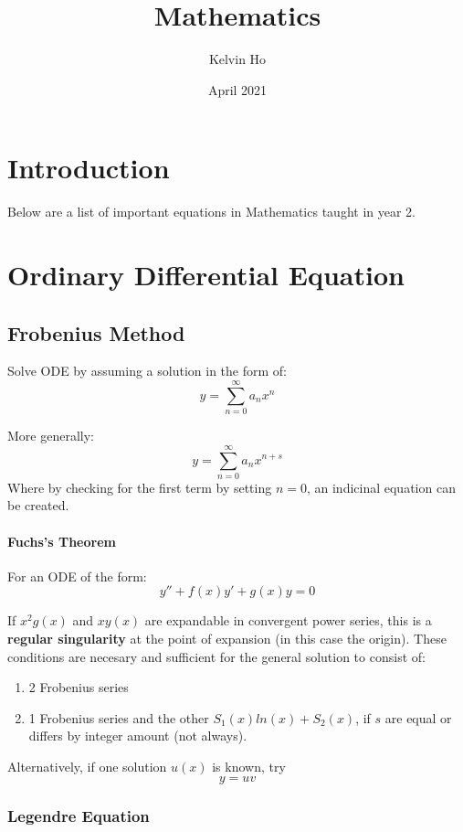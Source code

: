 \documentclass[12pt]{article}
\title{Mathematics}
\author{Kelvin Ho}
\date{April 2021}
\begin{document}
\maketitle

\section{Introduction}
Below are a list of important equations in Mathematics taught in year 2.



\section{Ordinary Differential Equation}

\subsection{Frobenius Method}
Solve ODE by assuming a solution in the form of: \[y = \sum_{n=0}^{\infty} a_n x^n\]

More generally:
\[y = \sum_{n=0}^{\infty} a_n x^{n+s}\]
Where by checking for the first term by setting $n=0$, an indicinal equation can be created. 

\paragraph{Fuchs's Theorem}

For an ODE of the form:
\[ y'' + f(x)y' + g(x) y = 0\]

If $x^2g(x)$ and $xy(x)$ are expandable in convergent power series, this is a \textbf{regular singularity} at the point of expansion (in this case the origin). These conditions are necesary and sufficient for the general solution to consist of:
\begin{enumerate}
    \item 2 Frobenius series
    \item 1 Frobenius series and the other $S_1(x)ln(x) + S_2(x)$, if $s$ are equal or differs by integer amount (not always).
\end{enumerate}

Alternatively, if one solution $u(x)$ is known, try \[y = uv \]


\subsubsection{Legendre Equation}
\end{document}
